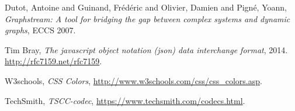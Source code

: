 \begin{thebibliography}{9}

   Dutot, Antoine and Guinand, Fr{\'e}d{\'e}ric and Olivier, Damien and Pign{\'e}, Yoann,
   \emph{Graphstream: A tool for bridging the gap between complex systems and dynamic graphs},
   ECCS 2007.

  Tim Bray,
  \emph{The javascript object notation (json) data interchange format},
  2014. \url{http://rfc7159.net/rfc7159}.
 
 W3schools,
 \emph{CSS Colors},
 \url{http://www.w3schools.com/css/css_colors.asp}.

 TechSmith, \emph{TSCC-codec},
 \url{https://www.techsmith.com/codecs.html}.

\end{thebibliography}